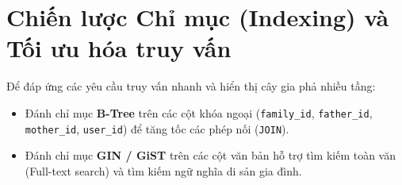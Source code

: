 \section{Chiến lược Chỉ mục (Indexing) và Tối ưu hóa truy vấn}
Để đáp ứng các yêu cầu truy vấn nhanh và hiển thị cây gia phả nhiều tầng:
\begin{itemize}
    \item Đánh chỉ mục \textbf{B-Tree} trên các cột khóa ngoại (\texttt{family\_id}, \texttt{father\_id}, \texttt{mother\_id}, \texttt{user\_id}) để tăng tốc các phép nối (\texttt{JOIN}).
    \item Đánh chỉ mục \textbf{GIN / GiST} trên các cột văn bản hỗ trợ tìm kiếm toàn văn (Full-text search) và tìm kiếm ngữ nghĩa di sản gia đình.
\end{itemize}
